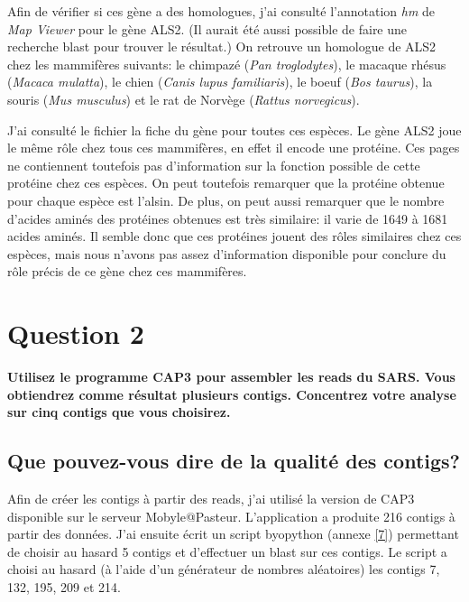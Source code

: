 \documentclass[10.9pt]{article} %
\begin{document}
Afin de vérifier si ces gène a des homologues, j'ai consulté l'annotation \emph{hm} de \emph{Map Viewer} pour le gène ALS2. 
(Il aurait été aussi possible de faire une recherche blast pour trouver le résultat.) On retrouve un homologue 
de ALS2 chez les mammifères suivants: le chimpazé (\emph{Pan troglodytes}), le macaque rhésus (\emph{Macaca mulatta}), 
le chien (\emph{Canis lupus familiaris}), le boeuf (\emph{Bos taurus}), la souris (\emph{Mus musculus}) et le rat de Norvège (\emph{Rattus norvegicus}).

J'ai consulté le fichier la fiche du gène pour toutes ces espèces. Le gène ALS2 joue le même rôle chez tous
ces mammifères, en effet il encode une protéine. Ces pages ne contiennent toutefois pas d'information sur
la fonction possible de cette protéine chez ces espèces. On peut toutefois remarquer que la protéine obtenue 
pour chaque espèce est l'alsin. De plus, on peut aussi remarquer que le nombre d'acides aminés des protéines 
obtenues est très similaire: il varie de 1649 à 1681 acides aminés. Il semble donc que ces protéines jouent 
des rôles similaires chez ces espèces, mais nous n'avons pas assez d'information disponible pour conclure
du rôle précis de ce gène chez ces mammifères.

 
\section{Question 2} %

{\bf Utilisez le programme CAP3 pour assembler les reads du SARS. Vous obtiendrez comme
résultat plusieurs contigs. Concentrez votre analyse sur cinq contigs que vous choisirez.}
\subsection[Qualité des contigs]{Que pouvez-vous dire de la qualité des contigs?}

Afin de créer les contigs à partir des reads, j'ai utilisé la version de CAP3 \cite{CAP3} disponible sur le serveur Mobyle@Pasteur.
L'application a produite 216 contigs à partir des données. J'ai ensuite écrit un script byopython (annexe \ref{7}) permettant de choisir
au hasard 5 contigs et d'effectuer un blast \cite{BLAST} sur ces contigs. Le script a choisi au hasard (à l'aide d'un générateur de
nombres aléatoires) les contigs 7, 132, 195, 209 et 214.
\end{document}
